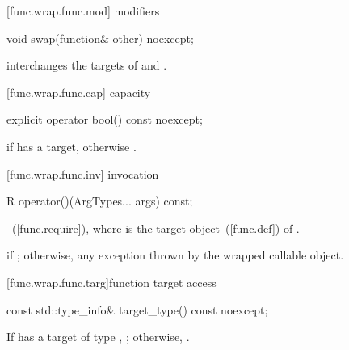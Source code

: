 [func.wrap.func.mod]{ modifiers}

%
%
\begin{itemdecl}
void swap(function& other) noexcept;
\end{itemdecl}

\begin{itemdescr}
\pnum\effects interchanges the targets of  and .
\end{itemdescr}

[func.wrap.func.cap]{ capacity}

%
\begin{itemdecl}
explicit operator bool() const noexcept;
\end{itemdecl}

\begin{itemdescr}
\pnum
\returns {} if  has a target, otherwise .
\end{itemdescr}

[func.wrap.func.inv]{ invocation}

%
%
%
\begin{itemdecl}
R operator()(ArgTypes... args) const;
\end{itemdecl}

\begin{itemdescr}
\pnum
\returns {}~(\ref{func.require}),
where  is the target object~(\ref{func.def}) of .

\pnum\throws
{} if ; otherwise, any
exception thrown by the wrapped callable object.
\end{itemdescr}

[func.wrap.func.targ]{function target access}

%
%
\begin{itemdecl}
const std::type_info& target_type() const noexcept;
\end{itemdecl}

\begin{itemdescr}
\pnum\returns If  has a target of type ,
  ; otherwise, .
\end{itemdescr}

